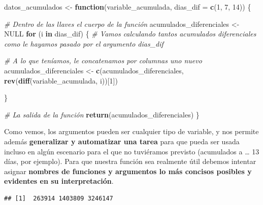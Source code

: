 \documentclass[11pt,]{book}
\newenvironment{Shaded}{\begin{snugshade}}{\end{snugshade}}
\newcommand{\CommentTok}[1]{\textcolor[rgb]{0.37,0.37,0.37}{\textit{#1}}}
\newcommand{\ControlFlowTok}[1]{\textcolor[rgb]{0.27,0.27,0.27}{\textbf{#1}}}
\newcommand{\DataTypeTok}[1]{\textcolor[rgb]{0.27,0.27,0.27}{#1}}
\newcommand{\DecValTok}[1]{\textcolor[rgb]{0.06,0.06,0.06}{#1}}
\newcommand{\KeywordTok}[1]{\textcolor[rgb]{0.27,0.27,0.27}{\textbf{#1}}}
\newcommand{\NormalTok}[1]{#1}
\newcommand{\OperatorTok}[1]{\textcolor[rgb]{0.43,0.43,0.43}{\textbf{#1}}}
\newcommand{\OtherTok}[1]{\textcolor[rgb]{0.37,0.37,0.37}{#1}}
\newcommand{\StringTok}[1]{\textcolor[rgb]{0.5,0.5,0.5}{#1}}
\begin{document}
\begin{Shaded}
\begin{Highlighting}[]
\NormalTok{datos_acumulados <-}\StringTok{ }\ControlFlowTok{function}\NormalTok{(variable_acumulada, }\DataTypeTok{dias_dif =} \KeywordTok{c}\NormalTok{(}\DecValTok{1}\NormalTok{, }\DecValTok{7}\NormalTok{, }\DecValTok{14}\NormalTok{)) \{}
  
  \CommentTok{# Dentro de las llaves el cuerpo de la función}
\NormalTok{  acumulados_diferenciales <-}\StringTok{ }\OtherTok{NULL}
  \ControlFlowTok{for}\NormalTok{ (i }\ControlFlowTok{in}\NormalTok{ dias_dif) \{ }\CommentTok{# Vamos calculando tantos acumulados diferenciales como le hayamos pasado por el argumento dias_dif}
    
    \CommentTok{# A lo que teníamos, le concatenamos por columnas uno nuevo}
\NormalTok{    acumulados_diferenciales <-}\StringTok{ }\KeywordTok{c}\NormalTok{(acumulados_diferenciales,}
                                  \KeywordTok{rev}\NormalTok{(}\KeywordTok{diff}\NormalTok{(variable_acumulada, i))[}\DecValTok{1}\NormalTok{])}
  
\NormalTok{  \}}
  
  \CommentTok{# La salida de la función}
  \KeywordTok{return}\NormalTok{(acumulados_diferenciales)}
\NormalTok{\}}
\end{Highlighting}
\end{Shaded}

Como vemos, los argumentos pueden ser cualquier tipo de variable, y nos permite además \textbf{generalizar y automatizar una tarea} para que pueda ser usada incluso en algún escenario para el que no tuviéramos previsto (acumulados a \ldots{} 13 días, por ejemplo). Para que nuestra función sea realmente útil debemos intentar asignar \textbf{nombres de funciones y argumentos lo más concisos posibles y evidentes en su interpretación}.

\begin{Shaded}
\end{Shaded}

\begin{verbatim}
## [1]  263914 1403809 3246147
\end{verbatim}

\begin{Shaded}
\end{Shaded}
\end{document}
